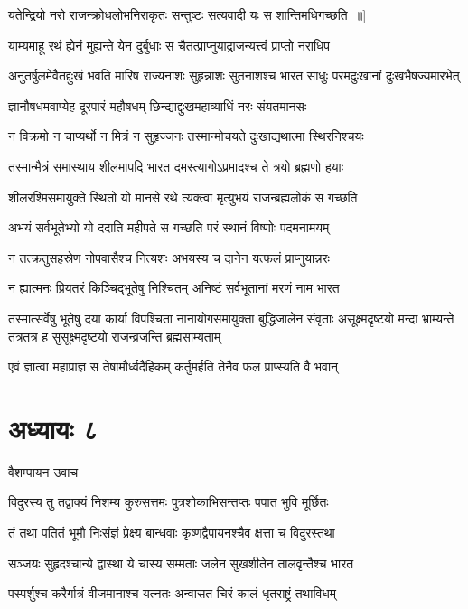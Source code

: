 \twolineshloka
{यतेन्द्रियो नरो राजन्क्रोधलोभनिराकृतः}
{सन्तुष्टः सत्यवादी यः स शान्तिमधिगच्छति ॥]}


\twolineshloka
{याम्यमाहू रथं ह्येनं मुह्यन्ते येन दुर्बुधाः}
{स चैतत्प्राप्नुयाद्राजन्यत्त्वं प्राप्तो नराधिप}


\threelineshloka
{अनुतर्षुलमेवैतद्दुःखं भवति मारिष}
{राज्यनाशः सुहृन्नाशः सुतनाशश्च भारत}
{साधुः परमदुःखानां दुःखभैषज्यमारभेत्}


\twolineshloka
{ज्ञानौषधमवाप्येह दूरपारं महौषधम्}
{छिन्द्याद्दुःखमहाव्याधिं नरः संयतमानसः}


\twolineshloka
{न विक्रमो न चाप्यर्थो न मित्रं न सुहृज्जनः}
{तस्मान्मोचयते दुःखाद्यथात्मा स्थिरनिश्चयः}


\twolineshloka
{तस्मान्मैत्रं समास्थाय शीलमापदि भारत}
{दमस्त्यागोऽप्रमादश्च ते त्रयो ब्रह्मणो हयाः}


\twolineshloka
{शीलरश्मिसमायुक्ते स्थितो यो मानसे रथे}
{त्यक्त्वा मृत्युभयं राजन्ब्रह्मलोकं स गच्छति}


\twolineshloka
{अभयं सर्वभूतेभ्यो यो ददाति महीपते}
{स गच्छति परं स्थानं विष्णोः पदमनामयम्}


\twolineshloka
{न तत्क्रतुसहस्रेण नोपवासैश्च नित्यशः}
{अभयस्य च दानेन यत्फलं प्राप्नुयान्नरः}


\twolineshloka
{न ह्यात्मनः प्रियतरं किञ्चिद्भूतेषु निश्चितम्}
{अनिष्टं सर्वभूतानां मरणं नाम भारत}


तस्मात्सर्वेषु भूतेषु दया कार्या विपश्चिता
\threelineshloka
{नानायोगसमायुक्ता बुद्धिजालेन संवृताः}
{असूक्ष्मदृष्टयो मन्दा भ्राम्यन्ते तत्रतत्र ह}
{सुसूक्ष्मदृष्टयो राजन्व्रजन्ति ब्रह्मसाम्यताम्}


\twolineshloka
{एवं ज्ञात्वा महाप्राज्ञ स तेषामौर्ध्वदैहिकम्}
{कर्तुमर्हति तेनैव फल प्राप्स्यति वै भवान्}


\chapter{अध्यायः ८}
\twolineshloka
{वैशम्पायन उवाच}
{}


\twolineshloka
{विदुरस्य तु तद्वाक्यं निशम्य कुरुसत्तमः}
{पुत्रशोकाभिसन्तप्तः पपात भुवि मूर्छितः}


\twolineshloka
{तं तथा पतितं भूमौ निःसंज्ञं प्रेक्ष्य बान्धवाः}
{कृष्णद्वैपायनश्चैव क्षत्ता च विदुरस्तथा}


\twolineshloka
{सञ्जयः सुहृदश्चान्ये द्वास्था ये चास्य सम्मताः}
{जलेन सुखशीतेन तालवृन्तैश्च भारत}


\twolineshloka
{पस्पर्शुश्च करैर्गात्रं वीजमानाश्च यत्नतः}
{अन्वासत चिरं कालं धृतराष्ट्रं तथाविधम्}


